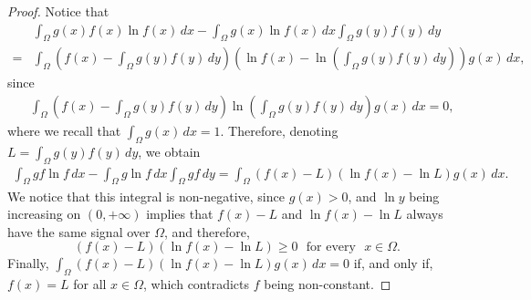 \documentclass[11pt]{article}
\newcommand{\parentheses}[1]{\left(#1\right)}
\theoremstyle{definition}
\theoremstyle{remark}
\begin{document}
\begin{proof}
    Notice that
    \begin{align*}
        &\int_\Omega g(x)f(x)\ln f(x)\,dx-\int_\Omega g(x)\ln f(x)\,dx\int_\Omega g(y)f(y)\,dy\\
        =&\int_\Omega\parentheses{f(x)-\int_\Omega g(y)f(y)\,dy}\parentheses{\ln f(x)-\ln\parentheses{\int_\Omega g(y)f(y)\,dy}}g(x)\,dx,
    \end{align*}
    since
    \begin{align*}
        &\int_\Omega \parentheses{f(x)-\int_\Omega g(y)f(y)\,dy}\ln\parentheses{\int_\Omega g(y)f(y)\,dy}g(x)\,dx=0,
    \end{align*}
    where we recall that $\int_\Omega g(x)\,dx=1$. Therefore, denoting $L=\int_\Omega g(y)f(y)\,dy$, we obtain
    \begin{align*}
        \int_\Omega gf\ln f\,dx-\int_\Omega g\ln f\,dx\int_\Omega gf\,dy=\int_\Omega\parentheses{f(x)-L}\parentheses{\ln f(x)-\ln L}g(x)\,dx.
    \end{align*}
    We notice that this integral is non-negative, since $g(x)>0$, and $\ln y$ being increasing on $(0,+\infty)$ implies that $f(x)-L$ and $\ln f(x)-\ln L$ always have the same signal over $\Omega$, and therefore,
    \begin{equation*}
        \parentheses{f(x)-L}\parentheses{\ln f(x)-\ln L}\geq0~~~\textrm{for every}~~~x\in\Omega.
    \end{equation*}
    Finally, $\int_\Omega\parentheses{f(x)-L}\parentheses{\ln f(x)-\ln L}g(x)\,dx=0$ if, and only if, $f(x)=L$ for all $x\in\Omega$, which contradicts $f$ being non-constant. 
\end{proof}
\end{document}
